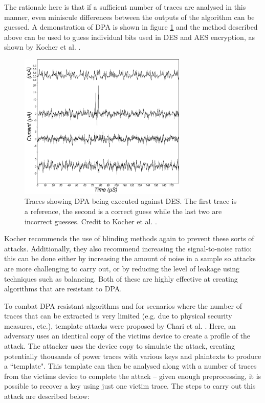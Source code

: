 \documentclass[a4paper,oneside,11pt]{article}
\begin{document}
The rationale here is that if a sufficient number of traces are analysed in
this manner, even miniscule differences between the outputs of the algorithm
can be guessed. A demonstration of DPA is shown in figure
\ref{fig:des-trace-dpa} and the method described above can be used to guess
individual bits used in DES and AES encryption, as shown by Kocher et al.
\cite{A/Kocher-1999-DPA, A/Kocher-2011-DPA}.

\begin{figure}[h]
	\centering

	\includegraphics[width=8cm]{des-trace-dpa}

	\caption{Traces showing DPA being executed against DES. The first trace
	is a reference, the second is a correct guess while the last two are
	incorrect guesses. Credit to Kocher et al. \cite{A/Kocher-1999-DPA}.}
	\label{fig:des-trace-dpa}
\end{figure}

Kocher recommends the use of blinding methods again to prevent these sorts of
attacks. Additionally, they also recommend increasing the signal-to-noise
ratio: this can be done either by increasing the amount of noise in a sample so
attacks are more challenging to carry out, or by reducing the level of leakage
using techniques such as balancing. Both of these are highly effective at
creating algorithms that are resistant to DPA.

To combat DPA resistant algorithms and for scenarios where the number of traces
that can be extracted is very limited (e.g. due to physical security measures,
etc.), template attacks were proposed by Chari et al.
\cite{A/Chari-2003-Template}. Here, an adversary uses an identical copy of the
victims device to create a profile of the attack. The attacker uses the device
copy to simulate the attack, creating potentially thousands of power traces
with various keys and plaintexts to produce a ``template". This template can
then be analysed along with a number of traces from the victims device to
complete the attack -- given enough preprocessing, it is possible to recover a
key using just one victim trace. The steps to carry out this attack are
described below:
\end{document}
